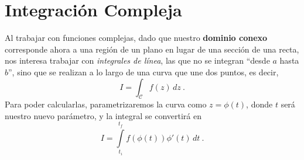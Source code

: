 






\section{Integración Compleja}

Al trabajar con funciones complejas, dado que nuestro \textbf{dominio conexo} corresponde ahora a una región de un plano en lugar de una sección de una recta, nos interesa trabajar con \emph{integrales de línea}, las que no se integran ``desde $a$ hasta $b$'', sino que se realizan a lo largo de una curva que une dos puntos, es decir,
\begin{equation*}
    I = \int_\mathcal{C} f(z) \, dz \ .
\end{equation*}
Para poder calcularlas, parametrizaremos la curva como $z = \phi(t)$, donde $t$ será nuestro nuevo parámetro, y la integral se convertirá en 
\begin{equation*}
    I = \int\limits^{t_f}_{t_i} f(\phi(t)) \phi'(t) \, dt \ .
\end{equation*}


